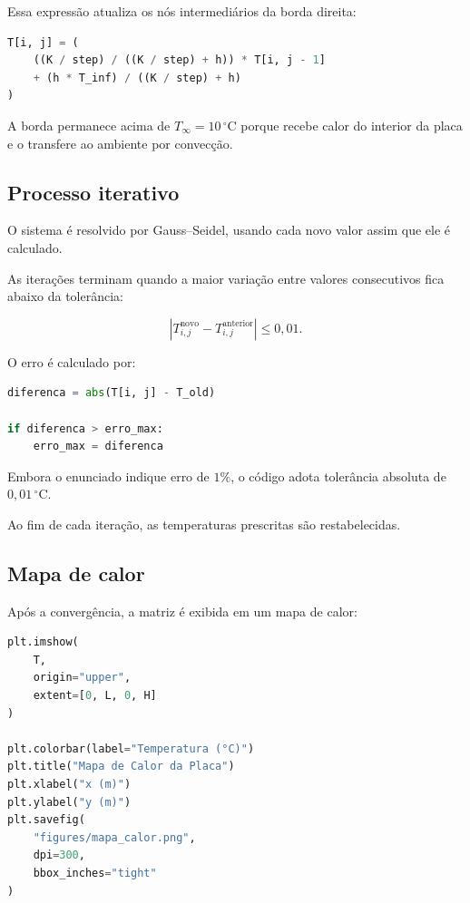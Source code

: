 \documentclass[
    12pt,
    oneside,
    a4paper,
    english,
    brazilian,
    chapter=TITLE,
    sumario=tradicional
]{abntex2}
\begin{document}
Essa expressão atualiza os nós intermediários da borda direita:

\begin{lstlisting}[language=Python]
T[i, j] = (
    ((K / step) / ((K / step) + h)) * T[i, j - 1]
    + (h * T_inf) / ((K / step) + h)
)
\end{lstlisting}

A borda permanece acima de $T_{\infty}=10\,^\circ$C porque recebe calor do
interior da placa e o transfere ao ambiente por convecção.

\subsection{Processo iterativo}

O sistema é resolvido por Gauss--Seidel, usando cada novo valor assim que ele é
calculado.

As iterações terminam quando a maior variação entre valores consecutivos fica
abaixo da tolerância:

\[
    \left|
    T_{i,j}^{\text{novo}}
    -
    T_{i,j}^{\text{anterior}}
    \right|
    \leq 0{,}01.
\]

O erro é calculado por:

\begin{lstlisting}[language=Python]
diferenca = abs(T[i, j] - T_old)

if diferenca > erro_max:
    erro_max = diferenca
\end{lstlisting}

Embora o enunciado indique erro de $1\%$, o código adota tolerância absoluta de
$0{,}01\,^\circ$C.

Ao fim de cada iteração, as temperaturas prescritas são restabelecidas.

\subsection{Mapa de calor}

Após a convergência, a matriz é exibida em um mapa de calor:

\begin{lstlisting}[language=Python]
plt.imshow(
    T,
    origin="upper",
    extent=[0, L, 0, H]
)

plt.colorbar(label="Temperatura (°C)")
plt.title("Mapa de Calor da Placa")
plt.xlabel("x (m)")
plt.ylabel("y (m)")
plt.savefig(
    "figures/mapa_calor.png",
    dpi=300,
    bbox_inches="tight"
)
\end{lstlisting}
\end{document}
